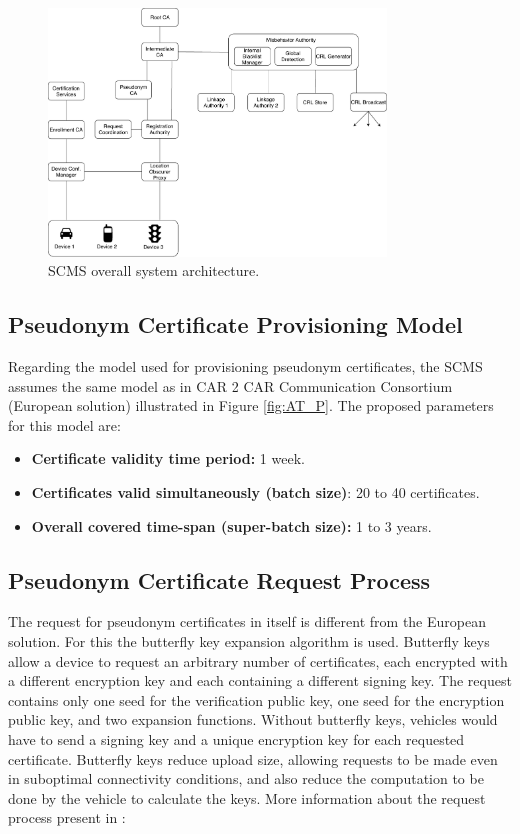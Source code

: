 \begin{figure}
	\centering
	\includegraphics[width=0.8\textwidth]{Figures/SCMS_PKI.pdf}
	\caption{\label{fig:SCMS_PKI}SCMS overall system  architecture.}
\end{figure}

\subsection{Pseudonym Certificate Provisioning Model}
\bigbreak
Regarding the model used for provisioning pseudonym certificates, the SCMS assumes the same model as in CAR 2 CAR Communication
Consortium \cite{generic_eu} (European solution) illustrated in Figure \ref{fig:AT_P}. The proposed parameters for this model are:
\begin{itemize}
	\item \textbf{Certificate validity time period:} 1 week.
	\item \textbf{Certificates valid simultaneously (batch size)}: 20 to 40 certificates.
	\item \textbf{Overall covered time-span (super-batch size):} 1 to 3 years.
\end{itemize}

\subsection{Pseudonym Certificate Request Process}

The request for pseudonym certificates in itself is different from the European solution. For this the
butterfly key expansion algorithm \cite{scms} is used. Butterfly keys allow a device to request an arbitrary number of certificates, each encrypted with a different encryption key and each containing a different signing key. The request contains only one seed for the verification public key, one seed for the encryption public key, and two expansion functions. Without butterfly keys, vehicles would have to send a signing key and a unique encryption key for each requested certificate. Butterfly keys reduce upload size, allowing requests to be made even in suboptimal connectivity conditions, and also reduce the computation to be done by the vehicle to calculate the keys. More information about the request process present in \cite{scms}:


